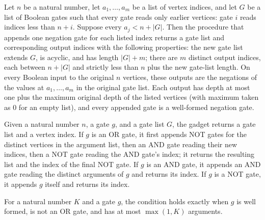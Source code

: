 \begin{theorem}
\label{BoolCircuit.emitNots_spec}
\leanok
{}
Let $n$ be a natural number, let $a_1,\ldots,a_m$ be a list of vertex indices, and
let $G$ be a list of Boolean gates such that every gate reads only earlier vertices:
gate $i$ reads indices less than $n+i$. Suppose every $a_j<n+|G|$. Then the procedure
that appends one negation gate for each listed index returns a gate list and
corresponding output indices with the following properties: the new gate list extends
$G$, is acyclic, and has length $|G|+m$; there are $m$ distinct output indices, each
between $n+|G|$ and strictly less than $n$ plus the new gate-list length. On every
Boolean input to the original $n$ vertices, these outputs are the negations of the
values at $a_1,\ldots,a_m$ in the original gate list. Each output has depth at most
one plus the maximum original depth of the listed vertices (with maximum taken as $0$
for an empty list), and every appended gate is a well-formed negation gate.
\end{theorem}

\begin{definition}
\label{BoolCircuit.deMorganGadget}
\leanok
{}
Given a natural number $n$, a gate $g$, and a gate list $G$, the gadget returns a gate
list and a vertex index. If $g$ is an OR gate, it first appends NOT gates for the
distinct vertices in the argument list, then an AND gate reading their new indices, then
a NOT gate reading the AND gate's index; it returns the resulting list and the index of
the final NOT gate. If $g$ is an AND gate, it appends an AND gate reading the distinct
arguments of $g$ and returns its index. If $g$ is a NOT gate, it appends $g$ itself and
returns its index.
\end{definition}

\begin{definition}
\label{BoolCircuit.DAGGate.NoOr}
\leanok
{}
For a natural number $K$ and a gate $g$, the condition holds exactly when $g$ is well
formed, is not an OR gate, and has at most $\max(1,K)$ arguments.
\end{definition}

